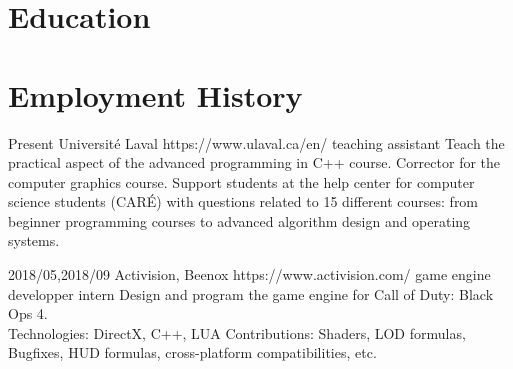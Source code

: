 \documentclass[10pt]{article} %
\begin{document}
\section{Education}







\section{Employment History}

\job
{}{Present}
{Université Laval}
{https://www.ulaval.ca/en/}
{teaching assistant}
{Teach the practical aspect of the advanced programming in C++ course. Corrector for the computer graphics course. Support students at the help center for computer science students (CARÉ) with questions related to 15 different courses: from beginner programming courses to advanced algorithm design and operating systems.}

\job
{2018/05,}{2018/09}
{Activision, Beenox}
{https://www.activision.com/}
{game engine developper intern}
{Design and program the game engine for Call of Duty: Black Ops 4.\\
 Technologies: DirectX, C++, LUA 
 Contributions: Shaders, LOD formulas, Bugfixes, HUD formulas, cross-platform compatibilities, etc.}
\end{document}
